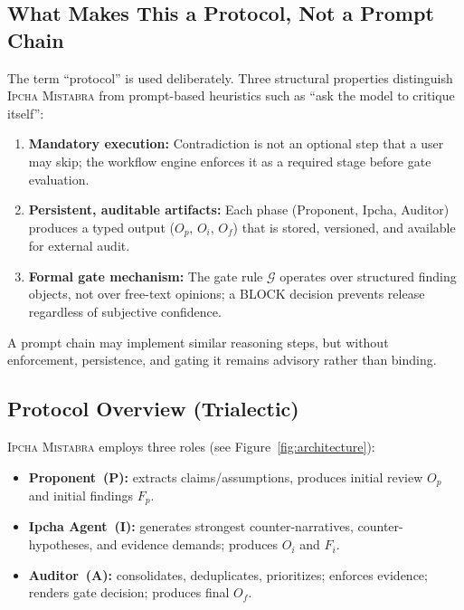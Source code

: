 \documentclass[11pt,a4paper]{article}
\newcommand{\methodname}{\textsc{Ipcha Mistabra}}
\begin{document}
\subsection{What Makes This a Protocol, Not a Prompt Chain}
\label{sec:protocol-criteria}
The term ``protocol'' is used deliberately.
Three structural properties distinguish \methodname{} from prompt-based heuristics such as ``ask the model to critique itself'':
\begin{enumerate}
  \item \textbf{Mandatory execution:} Contradiction is not an optional step that a user may skip; the workflow engine enforces it as a required stage before gate evaluation.
  \item \textbf{Persistent, auditable artifacts:} Each phase (Proponent, Ipcha, Auditor) produces a typed output ($O_p$, $O_i$, $O_f$) that is stored, versioned, and available for external audit.
  \item \textbf{Formal gate mechanism:} The gate rule $\mathcal{G}$ operates over structured finding objects, not over free-text opinions; a BLOCK decision prevents release regardless of subjective confidence.
\end{enumerate}
A prompt chain may implement similar reasoning steps, but without enforcement, persistence, and gating it remains advisory rather than binding.

\subsection{Protocol Overview (Trialectic)}
\methodname{} employs three roles (see Figure~\ref{fig:architecture}):
\begin{itemize}
  \item \textbf{Proponent~(P):} extracts claims/assumptions, produces initial review $O_p$ and initial findings $F_p$.
  \item \textbf{Ipcha Agent~(I):} generates strongest counter-narratives, counter-hypotheses, and evidence demands; produces $O_i$ and $F_i$.
  \item \textbf{Auditor~(A):} consolidates, deduplicates, prioritizes; enforces evidence; renders gate decision; produces final $O_f$.
\end{itemize}
\end{document}
